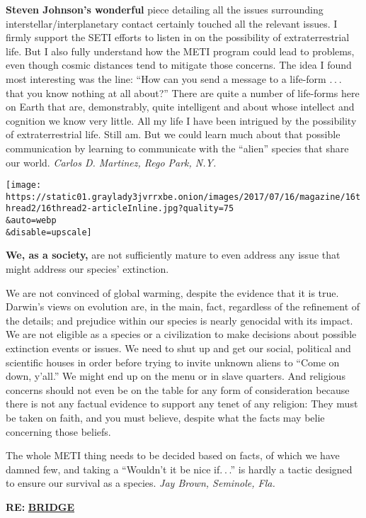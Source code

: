 \textbf{Steven Johnson's wonderful} piece detailing all the issues
surrounding interstellar/interplanetary contact certainly touched all
the relevant issues. I firmly support the SETI efforts to listen in on
the possibility of extraterrestrial life. But I also fully understand
how the METI program could lead to problems, even though cosmic
distances tend to mitigate those concerns. The idea I found most
interesting was the line: ``How can you send a message to a life-form
. . . that you know nothing at all about?'' There are quite a number of
life-forms here on Earth that are, demonstrably, quite intelligent and
about whose intellect and cognition we know very little. All my life I
have been intrigued by the possibility of extraterrestrial life. Still
am. But we could learn much about that possible communication by
learning to communicate with the ``alien'' species that share our world.
\emph{Carlos D. Martinez, Rego Park, N.Y.}

\texttt{[image: https://static01.graylady3jvrrxbe.onion/images/2017/07/16/magazine/16thread2/16thread2-articleInline.jpg?quality=75\\\&auto=webp\\\&disable=upscale]}

\textbf{We, as a society,} are not sufficiently mature to even address
any issue that might address our species' extinction.

We are not convinced of global warming, despite the evidence that it is
true. Darwin's views on evolution are, in the main, fact, regardless of
the refinement of the details; and prejudice within our species is
nearly genocidal with its impact. We are not eligible as a species or a
civilization to make decisions about possible extinction events or
issues. We need to shut up and get our social, political and scientific
houses in order before trying to invite unknown aliens to ``Come on
down, y'all.'' We might end up on the menu or in slave quarters. And
religious concerns should not even be on the table for any form of
consideration because there is not any factual evidence to support any
tenet of any religion: They must be taken on faith, and you must
believe, despite what the facts may belie concerning those beliefs.

The whole METI thing needs to be decided based on facts, of which we
have damned few, and taking a ``Wouldn't it be nice if. . .'' is hardly
a tactic designed to ensure our survival as a species. \emph{Jay Brown,
Seminole, Fla.}

\textbf{RE:}
\href{https://www.nytimes3xbfgragh.onion/2017/06/27/magazine/can-a-tech-start-up-successfully-educate-children-in-the-developing-world.html}{\textbf{BRIDGE}}

